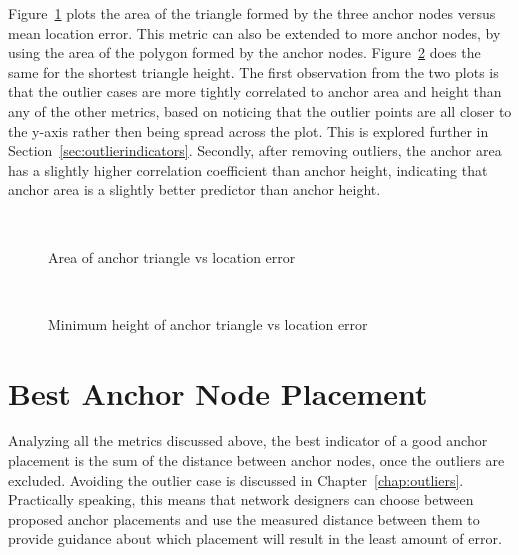 Figure~\ref{fig:AnchorArea} plots the area of the triangle formed by the three anchor nodes versus mean location error.  This metric can also be extended to more anchor nodes, by using the area of the polygon formed by the anchor nodes.  Figure~\ref{fig:AnchorHeight} does the same for the shortest triangle height. The first observation from the two plots is that the outlier cases are more tightly correlated to anchor area and height than any of the other metrics, based on noticing that the outlier points are all closer to the y-axis rather then being spread across the plot. This is explored further in Section~\ref{sec:outlierindicators}.  Secondly, after removing outliers, the anchor area has a slightly higher correlation coefficient than anchor height, indicating that anchor area is a slightly better predictor than anchor height.

\begin{figure}
  \centering
\\
	\caption{Area of anchor triangle vs location error}	
	\label{fig:AnchorArea}
\end{figure}

\begin{figure}
  \centering
		\\
	\caption{Minimum height of anchor triangle vs location error}	
	\label{fig:AnchorHeight}
\end{figure}

\section{Best Anchor Node Placement}

Analyzing all the metrics discussed above, the best indicator of a good anchor placement is the sum of the distance between anchor nodes, once the outliers are excluded.  Avoiding the outlier case is discussed in Chapter~\ref{chap:outliers}.  Practically speaking, this means that network designers can choose between proposed anchor placements and use the measured distance between them to provide guidance about which placement will result in the least amount of error. 

